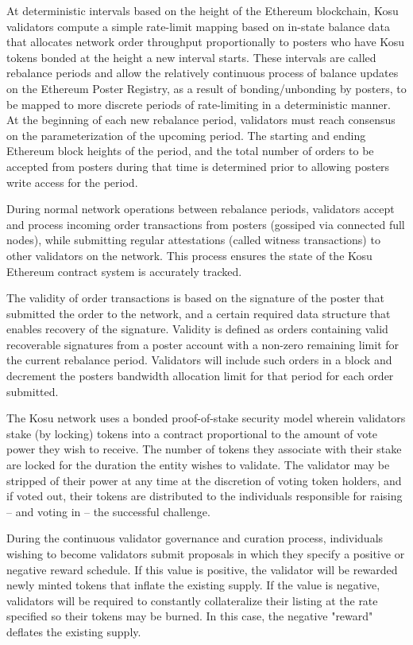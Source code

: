 \documentclass[10pt]{article}
\begin{document}
At deterministic intervals based on the height of the Ethereum blockchain, Kosu validators compute a simple rate-limit mapping based on in-state balance data that allocates network order throughput proportionally to posters who have Kosu tokens bonded at the height a new interval starts. These intervals are called rebalance periods and allow the relatively continuous process of balance updates on the Ethereum Poster Registry, as a result of bonding/unbonding by posters, to be mapped to more discrete periods of rate-limiting in a deterministic manner. At the beginning of each new rebalance period, validators must reach consensus on the parameterization of the upcoming period. The starting and ending Ethereum block heights of the period, and the total number of orders to be accepted from posters during that time is determined prior to allowing posters write access for the period.
\medskip

During normal network operations between rebalance periods, validators accept and process incoming order transactions from posters (gossiped via connected full nodes), while submitting regular attestations (called witness transactions) to other validators on the network. This process ensures the state of the Kosu Ethereum contract system is accurately tracked.
\medskip

The validity of order transactions is based on the signature of the poster that submitted the order to the network, and a certain required data structure that enables recovery of the signature. Validity is defined as orders containing valid recoverable signatures from a poster account with a non-zero remaining limit for the current rebalance period. Validators will include such orders in a block and decrement the posters bandwidth allocation limit for that period for each order submitted. 
\medskip

The Kosu network uses a bonded proof-of-stake security model wherein validators stake (by locking) tokens into a contract proportional to the amount of vote power they wish to receive. The number of tokens they associate with their stake are locked for the duration the entity wishes to validate. The validator may be stripped of their power at any time at the discretion of voting token holders, and if voted out, their tokens are distributed to the individuals responsible for raising – and voting in – the successful challenge. 
\medskip

During the continuous validator governance and curation process, individuals wishing to become validators submit proposals in which they specify a positive or negative reward schedule. If this value is positive, the validator will be rewarded newly minted tokens that inflate the existing supply. If the value is negative, validators will be required to constantly collateralize their listing at the rate specified so their tokens may be burned. In this case, the negative "reward" deflates the existing supply. 
\medskip
\end{document}
